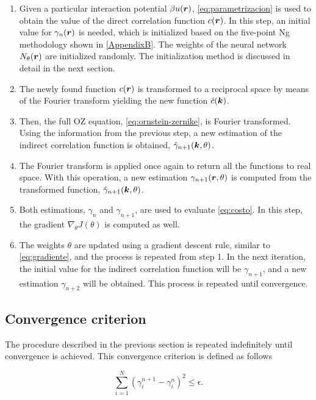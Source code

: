 \begin{enumerate}
    \item Given a particular interaction potential $\beta u(\bm{r})$, \autoref{eq:parametrizacion} is used to obtain the value of the direct correlation function $c(\bm{r})$. In this step, an initial value for $\gamma_{n}(\bm{r})$ is needed, which is initialized based on the five-point Ng methodology shown in \autoref{AppendixB}. The weights of the neural network $N_{\theta}(\bm{r})$ are initialized randomly. The initialization method is discussed in detail in the next section.
    \item The newly found function $c(\bm{r})$ is transformed to a reciprocal space by means of the Fourier transform yielding the new function $\hat{c}(\bm{k})$.
    \item Then, the full OZ equation, \autoref{eq:ornstein-zernike}, is Fourier transformed. Using the information from the previous step, a new estimation of the indirect correlation function is obtained, $\hat{\gamma}_{n+1}(\bm{k}, \theta)$.
    \item The Fourier transform is applied once again to return all the functions to real space. With this operation, a new estimation $\gamma_{n+1}(\bm{r}, \theta)$ is computed from the transformed function, $\hat{\gamma}_{n+1}(\bm{k}, \theta)$.
    \item Both estimations, $\gamma_{n}$ and $\gamma_{n+1}$, are used to evaluate \autoref{eq:costo}. In this step, the gradient $\nabla_{\theta} J(\theta)$ is computed as well.
    \item The weights $\theta$ are updated using a gradient descent rule, similar to \autoref{eq:gradiente}, and the process is repeated from step 1. In the next iteration, the initial value for the indirect correlation function will be $\gamma_{n+1}$, and a new estimation $\gamma_{n+2}$ will be obtained. This process is repeated until convergence.
\end{enumerate}

\subsection{Convergence criterion}
The procedure described in the previous section is repeated indefinitely until convergence
is achieved. This convergence criterion is defined as follows

\begin{equation}
    \sum_{i=1}^{N} {\left( \gamma^{n+1}_{i} - \gamma^{n}_{i} \right)}^2 \leq \epsilon .
    \label{eq:tolerancia}
\end{equation}

